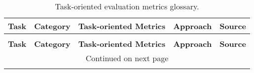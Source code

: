 \onecolumn

\begin{small}
\begin{center}
\begin{longtable}{@{}p{}p{}p{}p{}p{}@{}}
\caption[Task-oriented evaluation metrics glossary]{Task-oriented evaluation metrics glossary.} \label{tab: long_table_task_metrics_src} \\

\toprule
\textbf{Task} & \textbf{Category} & \textbf{Task-oriented Metrics} & \textbf{Approach}  & \textbf{Source} \\ \midrule 
\endfirsthead

\\
\midrule 
\textbf{Task} & \textbf{Category} & \textbf{Task-oriented Metrics} & \textbf{Approach}  & \textbf{Source} \\ \midrule
\endhead

\hline \multicolumn{5}{c}{{Continued on next page}} \\ \hline
\endfoot

\hline \bottomrule
\endlastfoot


\end{longtable}
\end{center}
\end{small}
